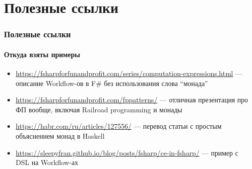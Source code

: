 \documentclass{../../slides-style}
\begin{document}
    \section{Полезные ссылки}

    \begin{frame}
        \frametitle{Полезные ссылки}
        \framesubtitle{Откуда взяты примеры}
        \begin{small}
            \begin{itemize}
                \item \url{https://fsharpforfunandprofit.com/series/computation-expressions.html} --- описание Workflow-ов в F\# без использования слова \enquote{монада}
                \item \url{https://fsharpforfunandprofit.com/fppatterns/} --- отличная презентация про ФП вообще, включая Railroad programming и монады
                \item \url{https://habr.com/ru/articles/127556/} --- перевод статьи с простым объяснением монад в Haskell
                \item \url{https://sleepyfran.github.io/blog/posts/fsharp/ce-in-fsharp/} --- пример с DSL на Workflow-ах
            \end{itemize}
        \end{small}
    \end{frame}
\end{document}
